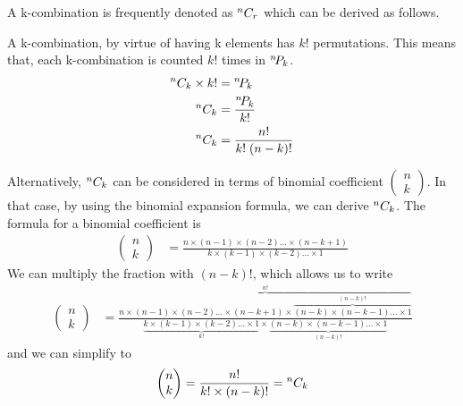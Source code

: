A k-combination is frequently denoted as \mbox{${}^{n}C_{r}$} which can be derived as follows.

A k-combination, by virtue of having k elements has \mbox{$k!$} permutations. This means that, each k-combination is counted \mbox{$k!$} times in \mbox{${}^{n}\!P_{k}$}.
\begin{align}
    {}^{n}C_{k}\times k! & = {}^{n}\!P_{k} \nonumber            \\
    {}^{n}C_{k}          & = \frac{{}^{n}\!P_{k}}{k!} \nonumber \\
    {}^{n}C_{k}          & = \frac{n!}{k!\;(n-k)!}
\end{align}

Alternatively, \mbox{${}^{n}C_{k}$} can be considered in terms of binomial coefficient \mbox{$\begin{pmatrix} n \\ k\end{pmatrix}$}. In that case, by using the binomial expansion formula, we can derive \mbox{${}^{n}C_{k}$}. The formula for a binomial coefficient is
\begin{align}
    \begin{pmatrix} n \\ k\end{pmatrix} & = \frac{n\times (n-1) \times (n-2) \dots \times (n-k+1)}{k\times (k-1) \times (k-2) \dots \times 1} \nonumber
\end{align}
We can multiply the fraction with \mbox{$(n-k)!$}, which allows us to write
\begin{align}
    \begin{pmatrix}
        n \\
        k
    \end{pmatrix}
     & = \frac{\overbrace{n\times (n-1) \times (n-2) \dots \times (n-k+1)\times \overbrace{(n-k) \times (n-k-1) \dots \times 1}^{(n-k)!}}^{n!}}{\underbrace{k\times (k-1) \times (k-2) \dots \times 1}_{k!}\times \underbrace{(n-k) \times (n-k-1) \dots \times 1}_{(n-k)!}} \nonumber
\end{align}
and we can simplify to
\begin{align}
    \begin{pmatrix} n \\ k\end{pmatrix} = \frac{n!}{k!\times (n-k)!} = {}^{n}C_{k}
\end{align}

